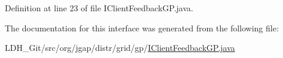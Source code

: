 Definition at line 23 of file I\-Client\-Feedback\-G\-P.\-java.



The documentation for this interface was generated from the following file\-:\begin{DoxyCompactItemize}
\item 
L\-D\-H\-\_\-\-Git/src/org/jgap/distr/grid/gp/\hyperlink{_i_client_feedback_g_p_8java}{I\-Client\-Feedback\-G\-P.\-java}\end{DoxyCompactItemize}
